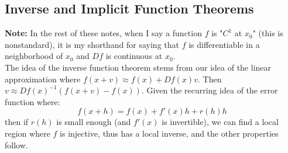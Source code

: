 \documentclass[10pt,letterpaper]{article} %
\begin{document}
\subsection{Inverse and Implicit Function Theorems}
\textbf{Note:} In the rest of these notes, when I say a function $f$ is "$C^1$ at $x_0$" (this is nonstandard), it is my shorthand for saying that $f$ is differentiable in a neighborhood of $x_0$ and $Df$ is continuous at $x_0$.\\

The idea of the inverse function theorem stems from our idea of the linear approximation where $f(x+v) \approx f(x) + Df(x)v$. Then $v \approx Df(x)^{-1}(f(x+v) - f(x))$. Given the recurring idea of the error function where:
\begin{equation*}
f(x+h) = f(x) + f'(x)h + r(h)h
\end{equation*}
then if $r(h)$ is small enough (and $f'(x)$ is invertible), we can find a local region where $f$ is injective, thus has a local inverse, and the other properties follow.
\end{document}
